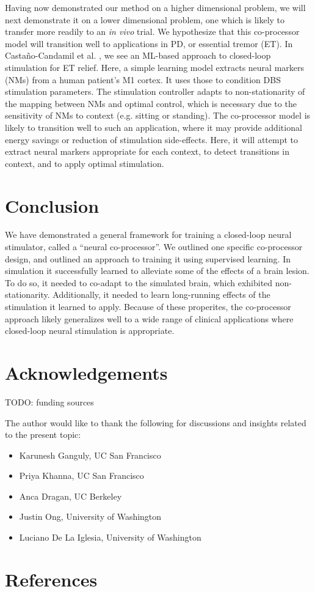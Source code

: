 \documentclass[12pt]{iopart}
\begin{document}
Having now demonstrated our method on a higher dimensional problem, we will next demonstrate
it on a lower dimensional problem, one which is likely to transfer more readily to
an \textit{in vivo} trial. We hypothesize that this co-processor model will transition well
to applications in PD, or essential tremor (ET). In Castaño-Candamil et al. \cite{castano.pd},
we see an ML-based approach to closed-loop stimulation for ET relief. Here, a simple learning
model extracts neural markers (NMs) from a human patient's M1 cortex. It uses those to
condition DBS stimulation parameters. The stimulation controller adapts to non-stationarity
of the mapping between NMs and optimal control, which is necessary due to the sensitivity
of NMs to context (e.g. sitting or standing). The co-processor model is likely to
transition well to such an application, where it may provide additional energy savings
or reduction of stimulation side-effects. Here, it will attempt to extract neural
markers appropriate for each context, to detect transitions in context, and to apply
optimal stimulation.

\section{Conclusion}
We have demonstrated a general framework for training a closed-loop neural stimulator,
called a ``neural co-processor''. We outlined one specific co-processor design, and
outlined an approach to training it using supervised learning. In simulation it
successfully learned to alleviate some of the effects of a brain lesion. To do so, it
needed to co-adapt to the simulated brain, which exhibited non-stationarity. Additionally,
it needed to learn long-running effects of the stimulation it learned to apply. Because of
these properites, the co-processor approach likely generalizes well to a wide range of
clinical applications where closed-loop neural stimulation is appropriate.

\section{Acknowledgements}
TODO: funding sources

The author would like to thank the following for discussions and insights related to
the present topic:
\begin{itemize}
	\item Karunesh Ganguly, UC San Francisco
	\item Priya Khanna, UC San Francisco
	\item Anca Dragan, UC Berkeley
	\item Justin Ong, University of Washington
	\item Luciano De La Iglesia, University of Washington
\end{itemize}

\section{References}


\end{document}
